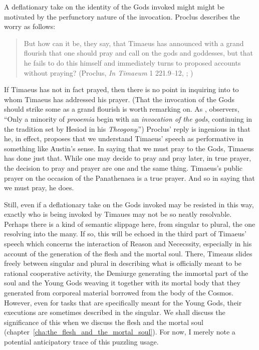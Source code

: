 A deflationary take on the identity of the Gods invoked might might be motivated by the perfunctory nature of the invocation. Proclus describes the worry as follows:
\begin{quote}
	But how can it be, they say, that Timaeus has announced with a grand flourish that one should pray and call on the gods and goddesses, but that he fails to do this himself and immediately turns to proposed accounts without praying? (Proclus, \emph{In Timaeum} 1 221.9--12, \citealt{Diehl:1903re}; \citealt[58]{Runia:2008aa})
\end{quote}
If Timaeus has not in fact prayed, then there is no point in inquiring into to whom Timaeus has addressed his prayer. (That the invocation of the Gods should strike some as a grand flourish is worth remarking on. As \citealt[104]{Runia:1997vz}, observers, ``Only a minority of \emph{prooemia} begin with an \emph{invocation of the gods}, continuing in the tradition set by Hesiod in his \emph{Theogony}.'') Proclus' reply is ingenious in that he, in effect, proposes that we understand Timaeus' speech as performative in something like Austin's \citeyearpar{Austin:1975nx} sense. In saying that we must pray to the Gods, Timaeus has done just that. While one may decide to pray and pray later, in true prayer, the decision to pray and prayer are one and the same thing. Timaeus's public prayer on the occasion of the Panathenaea is a true prayer. And so in saying that we must pray, he does.

Still, even if a deflationary take on the Gods invoked may be resisted in this way, exactly who is being invoked by Timaues may not be so neatly resolvable. Perhaps there is a kind of semantic slippage here, from singular to plural, the one resolving into the many. If so, this will be echoed in the third part of Timaeus' speech which concerns the interaction of Reason and Nececssity, especially in his account of the generation of the flesh and the mortal soul. There, Timeaus slides freely between singular and plural in describing what is officially meant to be rational cooperative activity, the Demiurge generating the immortal part of the soul and the Young Gods weaving it together with its mortal body that they generated from corporeal material borrowed from the body of the Cosmos. However, even for tasks that are specifically meant for the Young Gods, their executions are sometimes described in the singular. We shall discuss the significance of this when we discuss the flesh and the mortal soul (chapter~\ref{cha:the_flesh_and_the_mortal_soul}). For now, I merely note a potential anticipatory trace of this puzzling usage. 

